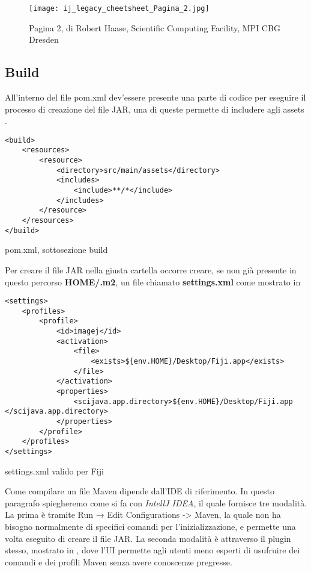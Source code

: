 \begin{figure}[H]
\centering
\texttt{[image: ij\_legacy\_cheetsheet\_Pagina\_2.jpg]}
\caption{Pagina 2, di Robert Haase, Scientific Computing Facility, MPI CBG Dresden}
\label{fig:7}
\end{figure}


\subsection{Build}
\noindent All'interno del file pom.xml dev'essere presente una parte di codice per eseguire il processo di creazione del file JAR, una di queste permette di includere agli assets .

\begin{listing}[H]
\begin{verbatim}
<build>
	<resources>
        <resource>
            <directory>src/main/assets</directory>
            <includes>
                <include>**/*</include>
            </includes>
        </resource>
    </resources>
</build>
\end{verbatim}
\caption{pom.xml, sottosezione build}\label{lst:build}
\end{listing}

\noindent Per creare il file JAR nella giusta cartella occorre creare, se non già presente in questo percorso
\textbf{HOME/.m2}, un file chiamato \textbf{settings.xml} come mostrato in 

\begin{listing}[H]
\begin{verbatim}
<settings>
    <profiles>
        <profile>
            <id>imagej</id>
            <activation>
                <file>
                    <exists>${env.HOME}/Desktop/Fiji.app</exists>
                </file>
            </activation>
            <properties>
                <scijava.app.directory>${env.HOME}/Desktop/Fiji.app </scijava.app.directory>
            </properties>
        </profile>
    </profiles>
</settings>
\end{verbatim}
\caption{settings.xml valido per Fiji}\label{lst:scijavadir}
\end{listing}

\noindent Come compilare un file Maven dipende dall'IDE di riferimento. In questo paragrafo spiegheremo come si fa con \textit{IntellJ IDEA}, il quale fornisce tre modalità. La prima è tramite Run → Edit Configurations -> Maven, la quale non ha bisogno normalmente di specifici comandi per l'inizializzazione, e permette una volta eseguito di creare il file JAR. La seconda modalità è attraverso il plugin stesso, mostrato in , dove l'UI permette agli utenti meno esperti di usufruire dei comandi e dei profili Maven senza avere conoscenze pregresse.

